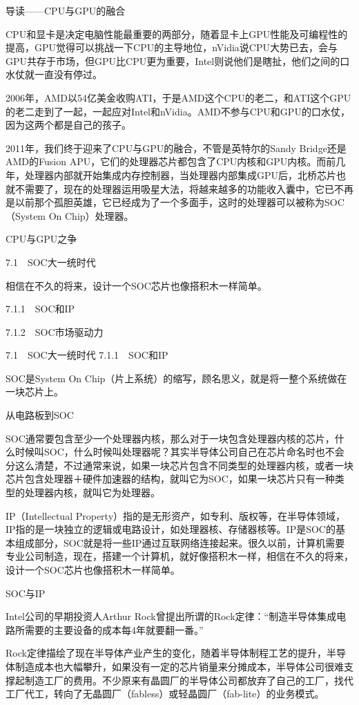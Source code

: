 \documentclass[12pt,UTF8]{ctexbook}
\begin{document}
导读——CPU与GPU的融合

CPU和显卡是决定电脑性能最重要的两部分，随着显卡上GPU性能及可编程性的提高，GPU觉得可以挑战一下CPU的主导地位，nVidia说CPU大势已去，会与GPU共存于市场，但GPU比CPU更为重要，Intel则说他们是瞎扯，他们之间的口水仗就一直没有停过。

2006年，AMD以54亿美金收购ATI，于是AMD这个CPU的老二，和ATI这个GPU的老二走到了一起，一起应对Intel和nVidia。AMD不参与CPU和GPU的口水仗，因为这两个都是自己的孩子。

2011年，我们终于迎来了CPU与GPU的融合，不管是英特尔的Sandy Bridge还是AMD的Fusion APU，它们的处理器芯片都包含了CPU内核和GPU内核。而前几年，处理器内部就开始集成内存控制器，当处理器内部集成GPU后，北桥芯片也就不需要了，现在的处理器运用吸星大法，将越来越多的功能收入囊中，它已不再是以前那个孤胆英雄，它已经成为了一个多面手，这时的处理器可以被称为SOC（System On Chip）处理器。

CPU与GPU之争


7.1　SOC大一统时代

相信在不久的将来，设计一个SOC芯片也像搭积木一样简单。

7.1.1　SOC和IP

7.1.2　SOC市场驱动力


7.1　SOC大一统时代
7.1.1　SOC和IP

SOC是System On Chip（片上系统）的缩写，顾名思义，就是将一整个系统做在一块芯片上。

从电路板到SOC

SOC通常要包含至少一个处理器内核，那么对于一块包含处理器内核的芯片，什么时候叫SOC，什么时候叫处理器呢？其实半导体公司自己在芯片命名时也不会分这么清楚，不过通常来说，如果一块芯片包含不同类型的处理器内核，或者一块芯片包含处理器＋硬件加速器的结构，就叫它为SOC，如果一块芯片只有一种类型的处理器内核，就叫它为处理器。

IP（Intellectual Property）指的是无形资产，如专利、版权等，在半导体领域，IP指的是一块独立的逻辑或电路设计，如处理器核、存储器核等。IP是SOC的基本组成部分，SOC就是将一些IP通过互联网络连接起来。很久以前，计算机需要专业公司制造，现在，搭建一个计算机，就好像搭积木一样，相信在不久的将来，设计一个SOC芯片也像搭积木一样简单。

SOC与IP

Intel公司的早期投资人Arthur Rock曾提出所谓的Rock定律：“制造半导体集成电路所需要的主要设备的成本每4年就要翻一番。”

Rock定律描绘了现在半导体产业产生的变化，随着半导体制程工艺的提升，半导体制造成本也大幅攀升，如果没有一定的芯片销量来分摊成本，半导体公司很难支撑起制造工厂的费用。不少原来有晶圆厂的半导体公司都放弃了自己的工厂，找代工厂代工，转向了无晶圆厂（fabless）或轻晶圆厂（fab-lite）的业务模式。
\end{document}
